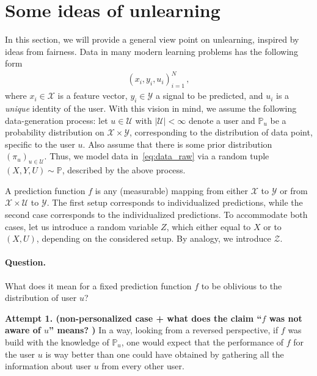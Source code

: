 \section{Some ideas of unlearning}


In this section, we will provide a general view point on unlearning, inspired by ideas from fairness. Data in many modern learning problems has the following form
\begin{align}
    \label{eq:data_raw}
    (x_i, y_i, u_i)_{i = 1}^{N}\,,
\end{align}
where $x_i \in \mathcal{X}$ is a feature vector, $y_i \in \mathcal{Y}$ a signal to be predicted, and $u_i$ is a \emph{unique} identity of the user. With this vision in mind, we assume the following data-generation process: let $u \in \mathcal{U}$ with $|\mathcal{U}| < \infty$ denote a user and $\mathbb{P}_{u}$ be a probability distribution on $\mathcal{X} \times \mathcal{Y}$, corresponding to the distribution of data point, specific to the user $u$.
Also assume that there is some prior distribution $(\pi_{u})_{u \in \mathcal{U}}$. Thus, we model data in~\eqref{eq:data_raw} via a random tuple $(X, Y, U) \sim \mathbb{P}$, described by the above process.

A prediction function $f$ is any (measurable) mapping from either $\mathcal{X}$ to $\mathcal{Y}$ or from $\mathcal{X} \times \mathcal{U}$ to $\mathcal{Y}$. The first setup corresponds to individualized predictions, while the second case corresponds to the individualized predictions. To accommodate both cases, let us introduce a random variable $Z$, which either equal to $X$ or to $(X, U)$, depending on the considered setup. By analogy, we introduce $\mathcal{Z}$.


\paragraph{Question.} What does it mean for a fixed prediction function $f$ to be oblivious to the distribution of user $u$?

\textbf{Attempt 1. (non-personalized case + what does the claim ``$f$ was not aware of $u$'' means? )}
In a way, looking from a reversed perspective, if $f$ was build with the knowledge of $\mathbb{P}_u$, one would expect that the performance of $f$ for the user $u$ is way better than one could have obtained by gathering all the information about user $u$ from every other user.

